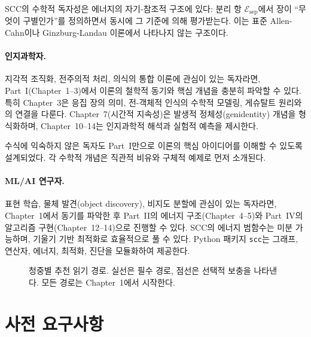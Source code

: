 SCC의 수학적 독자성은 에너지의 자기-참조적 구조에 있다: 분리 항 $\mathcal{E}_{\mathrm{sep}}$에서 장이 ``무엇이 구별인가''를 정의하면서 동시에 그 기준에 의해 평가받는다. 이는 표준 Allen-Cahn이나 Ginzburg-Landau 이론에서 나타나지 않는 구조이다.

\paragraph{인지과학자.}
지각적 조직화, 전주의적 처리, 의식의 통합 이론에 관심이 있는 독자라면, Part~I(Chapter~1--3)에서 이론의 철학적 동기와 핵심 개념을 충분히 파악할 수 있다. 특히 Chapter~3은 응집 장의 의미, 전-객체적 인식의 수학적 모델링, 게슈탈트 원리와의 연결을 다룬다. Chapter~7(시간적 지속성)은 발생적 정체성(genidentity) 개념을 형식화하며, Chapter~10--14는 인지과학적 해석과 실험적 예측을 제시한다.

수식에 익숙하지 않은 독자도 Part~I만으로 이론의 핵심 아이디어를 이해할 수 있도록 설계되었다. 각 수학적 개념은 직관적 비유와 구체적 예제로 먼저 소개된다.

\paragraph{ML/AI 연구자.}
표현 학습, 물체 발견(object discovery), 비지도 분할에 관심이 있는 독자라면, Chapter~1에서 동기를 파악한 후 Part~II의 에너지 구조(Chapter~4--5)와 Part~IV의 알고리즘 구현(Chapter~12--14)으로 진행할 수 있다. SCC의 에너지 범함수는 미분 가능하며, 기울기 기반 최적화로 효율적으로 풀 수 있다. Python 패키지 \texttt{scc}는 그래프, 연산자, 에너지, 최적화, 진단을 모듈화하여 제공한다.

\begin{figure}[t]
\centering
{}
\caption{청중별 추천 읽기 경로. 실선은 필수 경로, 점선은 선택적 보충을 나타낸다. 모든 경로는 Chapter~1에서 시작한다.}
\label{fig:reading-paths}
\end{figure}


\section*{사전 요구사항}

